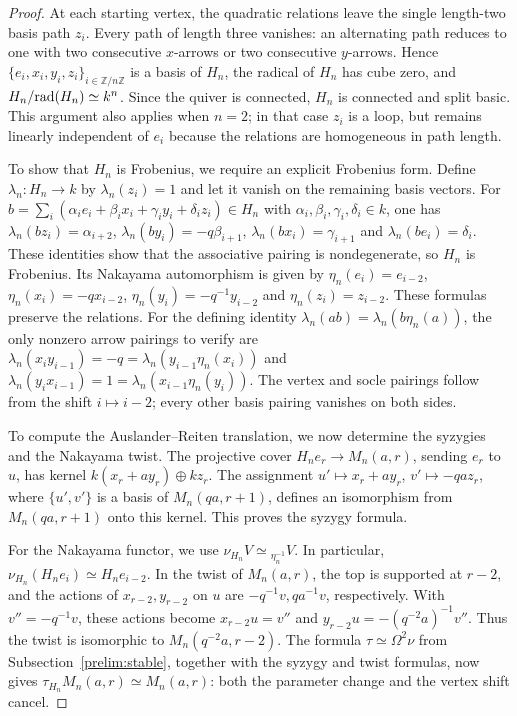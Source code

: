 \documentclass[11pt]{article}
\begin{document}
\begin{proof}
At each starting vertex, the quadratic relations leave the single
length-two basis path $z_i$.  Every path of length three vanishes:
an alternating path reduces to one with two consecutive $x$-arrows
or two consecutive $y$-arrows.  Hence $\{e_i,x_i,y_i,z_i\}_{i\in\mathbb Z/n\mathbb Z}$ is
a basis of $H_n$, the radical of $H_n$ has cube zero, and
$H_n/{\rm rad}(H_n)\simeq k^n$.  Since the quiver is connected, $H_n$ is
connected and split basic.  This argument also applies when $n=2$;
in that case $z_i$ is a loop, but remains linearly independent of
$e_i$ because the relations are homogeneous in path length.

To show that $H_n$ is Frobenius, we require an explicit Frobenius form.
Define $\lambda_n:H_n\to k$ by $\lambda_n(z_i)=1$ and let it
vanish on the remaining basis vectors.
For $b=\sum_i(\alpha_ie_i+\beta_ix_i+\gamma_iy_i+\delta_iz_i)\in H_n$
with $\alpha_i, \beta_i, \gamma_i, \delta_i\in k$, one has
$\lambda_n(bz_i)=\alpha_{i+2}$, $\lambda_n(by_i)=-q\beta_{i+1}$,
$\lambda_n(bx_i)=\gamma_{i+1}$ and $\lambda_n(be_i)=\delta_i$.
These identities show that the associative pairing is nondegenerate,
so $H_n$ is Frobenius. Its Nakayama automorphism is given by
$\eta_n(e_i)=e_{i-2}$, $\eta_n(x_i)=-q x_{i-2}$,
$\eta_n(y_i)=-q^{-1}y_{i-2}$ and $\eta_n(z_i)=z_{i-2}$.
These formulas preserve the relations.  For the defining
identity $\lambda_n(ab)=\lambda_n(b\eta_n(a))$, the only nonzero
arrow pairings to verify are
$\lambda_n(x_iy_{i-1})=-q=\lambda_n(y_{i-1}\eta_n(x_i))$ and
$\lambda_n(y_ix_{i-1})=1=\lambda_n(x_{i-1}\eta_n(y_i))$.
The vertex and socle pairings follow from the shift $i\mapsto i-2$;
every other basis pairing vanishes on both sides.

To compute the Auslander--Reiten translation, we now determine the
syzygies and the Nakayama twist. The projective cover
$H_ne_r\to M_n(a,r)$, sending $e_r$ to $u$, has kernel $k(x_r+a y_r)\oplus kz_r$.  The assignment
$u'\mapsto x_r+a y_r$, $v'\mapsto-qa z_r$, where $\{u', v'\}$ is a basis of $M_n(qa,r+1)$, defines an isomorphism from $M_n(qa,r+1)$ onto this kernel.  This proves the syzygy formula.

For the Nakayama functor, we use $\nu_{H_n}V\simeq{}_{\eta_n^{-1}}V$. In particular, $\nu_{H_n}(H_ne_i)\simeq H_ne_{i-2}$. In the twist of $M_n(a,r)$, the top is supported at $r-2$, and the
actions of $x_{r-2},y_{r-2}$ on $u$ are $-q^{-1}v,qa^{-1}v$,
respectively. With $v''=-q^{-1}v$, these actions become $x_{r-2}u=v''$ and $y_{r-2}u=-(q^{-2}a)^{-1}v''$.
Thus the twist is isomorphic to $M_n(q^{-2}a,r-2)$. The formula $\tau\simeq\Omega^2\nu$ from
Subsection~\ref{prelim:stable}, together with the syzygy and twist formulas, now gives $\tau_{H_n}M_n(a,r)\simeq M_n(a,r)$: both the parameter change and the vertex shift cancel.


\end{proof}
\end{document}
